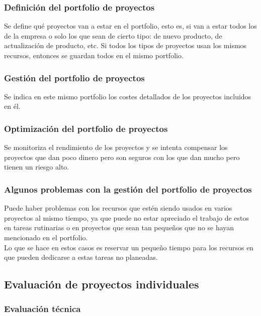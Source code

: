 \documentclass[12pt]{article}
\begin{document}
\subsubsection{Definición del portfolio de proyectos}
\label{2.3.1}

{Se define qué proyectos van a estar en el portfolio, esto es, si van a estar todos los de la empresa o solo los que sean de cierto tipo: de nuevo producto, de actualización de producto, etc. Si todos los tipos de proyectos usan los mismos recursos, entonces se guardan todos en el mismo portfolio.}

\subsubsection{Gestión del portfolio de proyectos}
\label{2.3.2}

{Se indica en este mismo portfolio los costes detallados de los proyectos incluidos en él.}

\subsubsection{Optimización del portfolio de proyectos}
\label{2.3.3}

{Se monitoriza el rendimiento de los proyectos y se intenta compensar los proyectos que dan poco dinero pero son seguros con los que dan mucho pero tienen un riesgo alto.}

\subsubsection{Algunos problemas con la gestión del portfolio de proyectos}
\label{2.3.4}

{Puede haber problemas con los recursos que estén siendo usados en varios proyectos al mismo tiempo, ya que puede no estar apreciado el trabajo de estos en tareas rutinarias o en proyectos que sean tan pequeños que no se hayan mencionado en el portfolio.} \\

{Lo que se hace en estos casos es reservar un pequeño tiempo para los recursos en que pueden dedicarse a estas tareas no planeadas.}

\subsection{Evaluación de proyectos individuales}
\label{2.4.0}
\subsubsection{Evaluación técnica}
\label{2.4.1}
\end{document}
